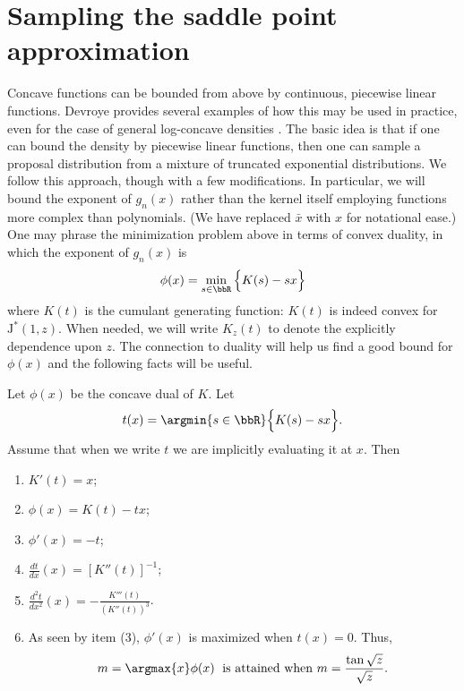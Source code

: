 \documentclass[12pt]{article}
\newcommand{\JJ}{\text{J}^*}
\newcommand{\utan}[1]{\frac{\tan{\sqrt{#1}}}{\sqrt{#1}}}
\newcommand{\dd}[2]{\frac{d #1}{d #2}}
\begin{document}
\section{Sampling the saddle point approximation}
\label{sec:largeb}

Concave functions can be bounded from above by continuous, piecewise linear
functions.  Devroye provides several examples of how this may be used in
practice, even for the case of general log-concave densities
\citep{devroye-1986, devroye-2012}.  The basic idea is that if one can bound the
density by piecewise linear functions, then one can sample a proposal
distribution from a mixture of truncated exponential distributions.  We follow
this approach, though with a few modifications.  In particular, we will bound
the exponent of $g_n(x)$ rather than the kernel itself employing functions more
complex than polynomials.  (We have replaced $\bar x$ with $x$ for notational
ease.)  One may phrase the minimization problem above in terms of convex
duality, in which the exponent of $g_n(x)$ is
\[
\phi(x) = \min_{s \in \bbR} \Big\{ K(s) - s x \Big\}
\]
where $K(t)$ is the cumulant generating function: $K(t)$ is indeed convex for
$\JJ(1,z)$.  When needed, we will write $K_z(t)$ to denote the explicitly
dependence upon $z$.  The connection to duality will help us find a good bound
for $\phi(x)$ and the following facts will be useful.

\begin{fact}
\label{fact:dual}
Let $\phi(x)$ be the concave dual of $K$.  Let
\[
t(x) = \argmin{s \in \bbR} \Big\{ K(s) - s x \Big\}.
\]
Assume that when we write $t$ we are implicitly evaluating it at $x$.  Then
\begin{enumerate}
\item $\displaystyle K'(t) = x$;
\item $\displaystyle \phi(x) = K(t) - t x$;
\item $\displaystyle \phi'(x) = -t$;
\item $\displaystyle \dd{t}{x}(x) = [K''(t)]^{-1}$;
\item $\displaystyle \dd{^2 t}{x^2}(x) = - \frac{K'''(t)}{(K''(t))^3}$.
\item As seen by item (3), $\phi'(x)$ is maximized when $t(x)=0$.  Thus, 
\[
m = \argmax{x} \phi(x) \; \text{ is attained when } m = \utan{z}.
\]
\end{enumerate}

\end{fact}
\end{document}
